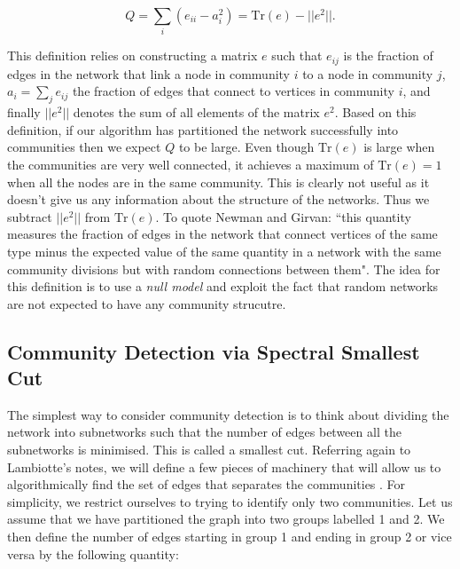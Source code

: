 $$ Q = \sum_i (e_{ii} - a_i^2) = \text{Tr}(e) - ||e^2||. $$

This definition relies on constructing a matrix $e$ such that $e_{ij}$ is the fraction of edges in the network that link a node in community $i$ to a node in community $j$, $a_i = \sum_j e_{ij}$ the fraction of edges that connect to vertices in community $i$, and finally $||e^2||$ denotes the sum of all elements of the matrix $e^2$. Based on this definition, if our algorithm has partitioned the network successfully into communities then we expect $Q$ to be large. Even though $\text{Tr}(e)$ is large when the communities are very well connected, it achieves a maximum of $\text{Tr}(e) = 1$ when all the nodes are in the same community. This is clearly not useful as it doesn't give us any information about the structure of the networks. Thus we subtract $||e^2||$ from $\text{Tr}(e)$. To quote Newman and Girvan: ``this quantity measures the fraction of edges in the network that connect vertices of the same type minus the expected value of the same quantity in a network with the same community divisions but with random connections between them". The idea for this definition is to use a \emph{null model} and exploit the fact that random networks are not expected to have any community strucutre.




\subsection{Community Detection via Spectral Smallest Cut}\label{sec:smallest_cut}
The simplest way to consider community detection is to think about dividing the network into subnetworks such that the number of edges between all the subnetworks is minimised. This is called a smallest cut. Referring again to Lambiotte's notes, we will define a few pieces of machinery that will allow us to algorithmically find the set of edges that separates the communities \cite[26-27]{oxford:renaud_notes}. For simplicity, we restrict ourselves to trying to identify only two communities. Let us assume that we have partitioned the graph into two groups labelled 1 and 2. We then define the number of edges starting in group 1 and ending in group 2 or vice versa by the following quantity:

